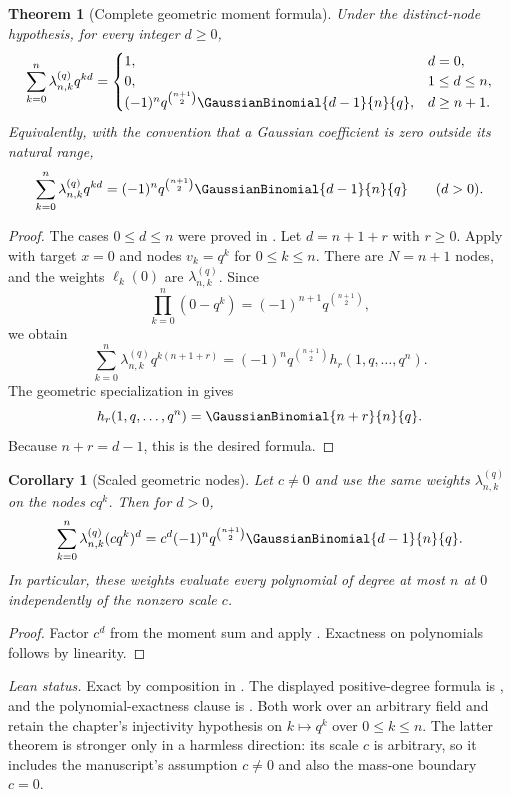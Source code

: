 \documentclass[11pt,a4paper,oneside,openany]{book}
\newtheorem{theorem}{Theorem}[chapter]
\newtheorem{corollary}[corollary]{Corollary}
\theoremstyle{definition}
\theoremstyle{remark}
\begin{document}
\begin{theorem}[Complete geometric moment formula]\label{thm:complete-geometric-moments}
Under the distinct-node hypothesis, for every integer $d\ge0$,
\begin{equation}\label{eq:complete-geometric-moments}
 \sum_{k=0}^{n}\lambda_{n,k}^{(q)}q^{kd}
 =
 \begin{cases}
  1,&d=0,\\
  0,&1\le d\le n,\\
  (-1)^nq^{\binom{n+1}{2}}\GaussianBinomial{d-1}{n}{q},&d\ge n+1.
 \end{cases}
\end{equation}
Equivalently, with the convention that a Gaussian coefficient is zero outside its natural range,
\begin{equation}\label{eq:complete-geometric-moments-compact}
 \sum_{k=0}^{n}\lambda_{n,k}^{(q)}q^{kd}
 =(-1)^nq^{\binom{n+1}{2}}\GaussianBinomial{d-1}{n}{q}
 \qquad(d>0).
\end{equation}
\end{theorem}

\begin{proof}
The cases $0\le d\le n$ were proved in .  Let $d=n+1+r$ with $r\ge0$.  Apply  with target $x=0$ and nodes
$v_k=q^k$ for $0\le k\le n$.  There are $N=n+1$ nodes, and the weights $\ell_k(0)$ are $\lambda_{n,k}^{(q)}$.  Since
\[
 \prod_{k=0}^{n}(0-q^k)=(-1)^{n+1}q^{\binom{n+1}{2}},
\]
we obtain
\[
 \sum_{k=0}^{n}\lambda_{n,k}^{(q)}q^{k(n+1+r)}
 =(-1)^nq^{\binom{n+1}{2}}h_r(1,q,\ldots,q^n).
\]
The geometric specialization in  gives
\[
 h_r(1,q,\ldots,q^n)=\GaussianBinomial{n+r}{n}{q}.
\]
Because $n+r=d-1$, this is the desired formula.
\end{proof}

\begin{corollary}[Scaled geometric nodes]\label{cor:scaled-geometric-moments}
Let $c\ne0$ and use the same weights $\lambda_{n,k}^{(q)}$ on the nodes $cq^k$.  Then for $d>0$,
\[
 \sum_{k=0}^{n}\lambda_{n,k}^{(q)}(cq^k)^d
 =c^d(-1)^nq^{\binom{n+1}{2}}\GaussianBinomial{d-1}{n}{q}.
\]
In particular, these weights evaluate every polynomial of degree at most $n$ at $0$ independently of the nonzero scale $c$.
\end{corollary}

\begin{proof}
Factor $c^d$ from the moment sum and apply .  Exactness on polynomials follows by linearity.
\end{proof}
\emph{Lean status.}  Exact by composition in
.  The displayed positive-degree formula is
, and the
polynomial-exactness clause is
.  Both work over
an arbitrary field and retain the chapter's injectivity hypothesis on
\(k\mapsto q^k\) over \(0\le k\le n\).  The latter theorem is stronger only in a
harmless direction: its scale \(c\) is arbitrary, so it includes the manuscript's
assumption \(c\ne0\) and also the mass-one boundary \(c=0\).
\end{document}
